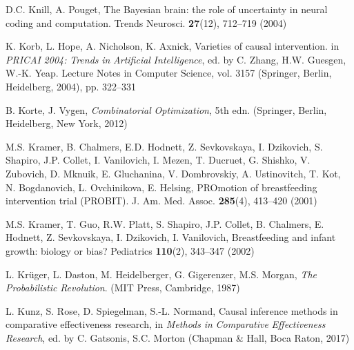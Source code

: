\begin{list}{}{\setlength{\leftmargin}{2.1em}\setlength{\labelwidth}{0pt}
  \setlength{\labelsep}{0pt}\setlength{\itemindent}{-2.1em}
  \setlength{\parsep}{0pt}\setlength{\itemsep}{2pt}\setlength{\topsep}{0pt}}
\item\label{refentry:REF186}D.C. Knill, A. Pouget, The Bayesian brain: the role of uncertainty in neural coding and computation. Trends Neurosci. \textbf{27}(12), 712--719 (2004)\label{refend:REF186}
\item\label{refentry:REF187}K. Korb, L. Hope, A. Nicholson, K. Axnick, Varieties of causal intervention. in \textit{PRICAI} \textit{2004:} \textit{Trends} \textit{in} \textit{Artificial} \textit{Intelligence}, ed. by C. Zhang, H.W. Guesgen, W.-K. Yeap. Lecture Notes in Computer Science, vol. 3157 (Springer, Berlin, Heidelberg, 2004), pp. 322--331\label{refend:REF187}
\item\label{refentry:REF188}B. Korte, J. Vygen, \textit{Combinatorial} \textit{Optimization}, 5th edn. (Springer, Berlin, Heidelberg, New York, 2012)\label{refend:REF188}
\item\label{refentry:REF189}M.S. Kramer, B. Chalmers, E.D. Hodnett, Z. Sevkovskaya, I. Dzikovich, S. Shapiro, J.P. Collet, I. Vanilovich, I. Mezen, T. Ducruet, G. Shishko, V. Zubovich, D. Mknuik, E. Gluchanina, V. Dombrovskiy, A. Ustinovitch, T. Kot, N. Bogdanovich, L. Ovchinikova, E. Helsing, PROmotion of breastfeeding intervention trial (PROBIT). J. Am. Med. Assoc. \textbf{285}(4), 413--420 (2001)\label{refend:REF189}
\item\label{refentry:REF190}M.S. Kramer, T. Guo, R.W. Platt, S. Shapiro, J.P. Collet, B. Chalmers, E. Hodnett, Z. Sevkovskaya, I. Dzikovich, I. Vanilovich, Breastfeeding and infant growth: biology or bias? Pediatrics \textbf{110}(2), 343--347 (2002)\label{refend:REF190}
\item\label{refentry:REF191}L. Krüger, L. Daston, M. Heidelberger, G. Gigerenzer, M.S. Morgan, \textit{The} \textit{Probabilistic} \textit{Revolution}. (MIT Press, Cambridge, 1987)\label{refend:REF191}
\item\label{refentry:REF192}L. Kunz, S. Rose, D. Spiegelman, S.-L. Normand, Causal inference methods in comparative effectiveness research, in \textit{Methods} \textit{in} \textit{Comparative} \textit{Effectiveness} \textit{Research}, ed. by C. Gatsonis, S.C. Morton (Chapman \& Hall, Boca Raton, 2017)\label{refend:REF192}

\end{list}
